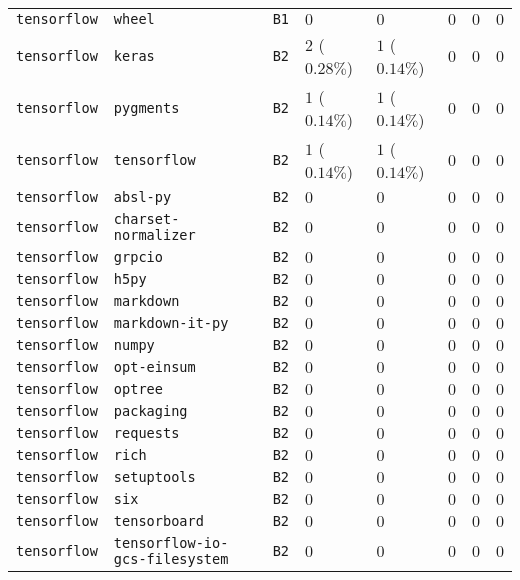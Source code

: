 \begin{table}
\begin{tabular}{llllllll}
\texttt{tensorflow} & \texttt{wheel} & \texttt{B1} & $0$ & $0$ & $0$ & $0$ & $0$ \\
\texttt{tensorflow} & \texttt{keras} & \texttt{B2} & $2$ ($0.28\%$) & $1$ ($0.14\%$) & $0$ & $0$ & $0$ \\
\texttt{tensorflow} & \texttt{pygments} & \texttt{B2} & $1$ ($0.14\%$) & $1$ ($0.14\%$) & $0$ & $0$ & $0$ \\
\texttt{tensorflow} & \texttt{tensorflow} & \texttt{B2} & $1$ ($0.14\%$) & $1$ ($0.14\%$) & $0$ & $0$ & $0$ \\
\texttt{tensorflow} & \texttt{absl-py} & \texttt{B2} & $0$ & $0$ & $0$ & $0$ & $0$ \\
\texttt{tensorflow} & \texttt{charset-normalizer} & \texttt{B2} & $0$ & $0$ & $0$ & $0$ & $0$ \\
\texttt{tensorflow} & \texttt{grpcio} & \texttt{B2} & $0$ & $0$ & $0$ & $0$ & $0$ \\
\texttt{tensorflow} & \texttt{h5py} & \texttt{B2} & $0$ & $0$ & $0$ & $0$ & $0$ \\
\texttt{tensorflow} & \texttt{markdown} & \texttt{B2} & $0$ & $0$ & $0$ & $0$ & $0$ \\
\texttt{tensorflow} & \texttt{markdown-it-py} & \texttt{B2} & $0$ & $0$ & $0$ & $0$ & $0$ \\
\texttt{tensorflow} & \texttt{numpy} & \texttt{B2} & $0$ & $0$ & $0$ & $0$ & $0$ \\
\texttt{tensorflow} & \texttt{opt-einsum} & \texttt{B2} & $0$ & $0$ & $0$ & $0$ & $0$ \\
\texttt{tensorflow} & \texttt{optree} & \texttt{B2} & $0$ & $0$ & $0$ & $0$ & $0$ \\
\texttt{tensorflow} & \texttt{packaging} & \texttt{B2} & $0$ & $0$ & $0$ & $0$ & $0$ \\
\texttt{tensorflow} & \texttt{requests} & \texttt{B2} & $0$ & $0$ & $0$ & $0$ & $0$ \\
\texttt{tensorflow} & \texttt{rich} & \texttt{B2} & $0$ & $0$ & $0$ & $0$ & $0$ \\
\texttt{tensorflow} & \texttt{setuptools} & \texttt{B2} & $0$ & $0$ & $0$ & $0$ & $0$ \\
\texttt{tensorflow} & \texttt{six} & \texttt{B2} & $0$ & $0$ & $0$ & $0$ & $0$ \\
\texttt{tensorflow} & \texttt{tensorboard} & \texttt{B2} & $0$ & $0$ & $0$ & $0$ & $0$ \\
\texttt{tensorflow} & \texttt{tensorflow-io-gcs-filesystem} & \texttt{B2} & $0$ & $0$ & $0$ & $0$ & $0$ \\

\end{tabular}
\end{table}
